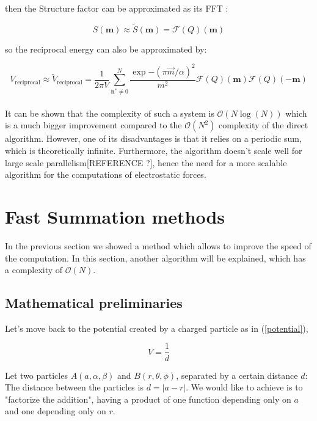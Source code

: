 \documentclass[11pt,twoside,a4paper]{report}
\begin{document}
then the Structure factor can be approximated as its FFT :

\begin{equation}
   S(\textbf{m}) \approx \widetilde{S}(\textbf{m}) = \mathcal{F}(Q)(\textbf{m})
\end{equation}

so the reciprocal energy can also be approximated by:

\begin{equation}
   V_{\text{reciprocal}} \approx \widetilde{V}_{\text{reciprocal}}   =\frac{1}{2 \pi V} \sum\limits_{\textbf{n}^* \neq 0}^{N}  \frac{\exp{-(\pi \overrightarrow{m}/\alpha)^2}}{m^2}\mathcal{F}(Q)(\textbf{m})\mathcal{F}(Q)(-\textbf{m})
\end{equation} \\

It can be shown that the complexity of such a system is $\mathcal{O}(N \log(N))$ which is a much bigger improvement compared to the $\mathcal{O}(N^2)$ complexity of the direct algorithm. However, one of its disadvantages is that it relies on a periodic sum, which is theoretically infinite. Furthermore, the algorithm doesn't scale well for large scale parallelism[REFERENCE ?], hence the need for a more scalable algorithm for the computations of electrostatic forces.



\section{Fast Summation methods}

    In the previous section we showed a method which allows to improve the speed of the computation. In this section, another algorithm will be explained, which has a complexity of $\mathcal{O}(N)$.\\
    
	\subsection{Mathematical preliminaries}
	
	Let's move back to the potential created by a charged particle as in (\ref{potential}),
	
	\begin{equation*}
	V = \frac{1}{d}
	\end{equation*}
	
	Let two particles $A(a,\alpha,\beta)$ and $B(r,\theta,\phi)$, separated by a certain distance $d$: The distance between the particles is $d = |a - r|$.
	We would like to achieve is to "factorize the addition", having a product of one function depending only on $a$ and one depending only on $r$.
	
\end{document}
